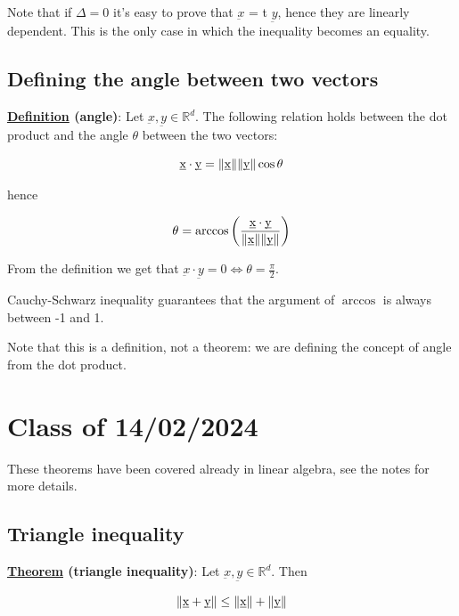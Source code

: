 \documentclass[10pt]{extarticle}
\newcommand{\R}{\mathbb{R}}
\begin{document}
Note that if $\Delta = 0$ it's easy to prove that $\underbar{x}$  = t $\underbar{y}$, hence they are linearly dependent. This is the only case in which the inequality becomes an equality.

\subsection{Defining the angle between two vectors}

\textbf{\underline{Definition} (angle)}: Let $\underbar{x}, \underbar{y} \in \R^d$. The following relation holds between the dot product and the angle $\theta$ between the two vectors:

$$
    \underbar{x} \cdot \underbar{y} = \norm{\underbar{x}} \norm{\underbar{y}} \cos \theta
$$

hence

$$
    \theta = \arccos \left( \frac{\underbar{x} \cdot \underbar{y}}{\norm{\underbar{x}} \norm{\underbar{y}}} \right)
$$

From the definition we get that $\underbar{x} \cdot \underbar{y} = 0 \iff \theta = \frac{\pi}{2}$.

Cauchy-Schwarz inequality guarantees that the argument of $\arccos$ is always between -1 and 1.

Note that this is a definition, not a theorem: we are defining the concept of angle from the dot product.

\section{Class of 14/02/2024}

These theorems have been covered already in linear algebra, see the notes for more details.

\subsection{Triangle inequality}

\textbf{\underline{Theorem} (triangle inequality)}: Let $\underbar{x}, \underbar{y} \in \R^d$. Then

$$
    \norm{\underbar{x} + \underbar{y}} \leq \norm{\underbar{x}} + \norm{\underbar{y}}
$$
\end{document}

